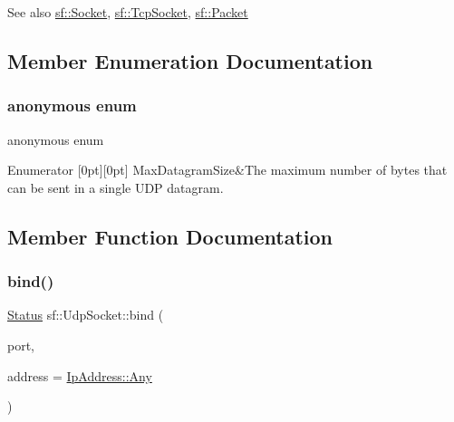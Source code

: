 \begin{DoxySeeAlso}{See also}
\hyperlink{classsf_1_1_socket}{sf\+::\+Socket}, \hyperlink{classsf_1_1_tcp_socket}{sf\+::\+Tcp\+Socket}, \hyperlink{classsf_1_1_packet}{sf\+::\+Packet} 
\end{DoxySeeAlso}


\subsection{Member Enumeration Documentation}
\mbox{\label{classsf_1_1_udp_socket_a2478e00ccd252e67b0f70d5f5a5fce37}} 
\subsubsection{\texorpdfstring{anonymous enum}{anonymous enum}}
{\footnotesize\ttfamily anonymous enum}

\begin{DoxyEnumFields}{Enumerator}
[0pt][0pt]{}\mbox{\label{classsf_1_1_udp_socket_a2478e00ccd252e67b0f70d5f5a5fce37a728a7d33027bee0d65f70f964dd9c9eb}} 
Max\+Datagram\+Size&The maximum number of bytes that can be sent in a single U\+DP datagram. \\
\hline

\end{DoxyEnumFields}


\subsection{Member Function Documentation}
\mbox{\label{classsf_1_1_udp_socket_ad764c3d06d90b4714dcc97a0d1647bcc}} 
\subsubsection{\texorpdfstring{bind()}{bind()}}
{\footnotesize\ttfamily \hyperlink{classsf_1_1_socket_a51bf0fd51057b98a10fbb866246176dc}{Status} sf\+::\+Udp\+Socket\+::bind (\begin{DoxyParamCaption}\item[{unsigned short}]{port,  }\item[{const \hyperlink{classsf_1_1_ip_address}{Ip\+Address} \&}]{address = {\ttfamily \hyperlink{classsf_1_1_ip_address_a3dbc10b0dc6804cc69e29342f7406907}{Ip\+Address\+::\+Any}} }\end{DoxyParamCaption})}



